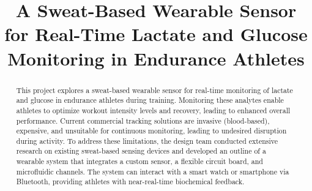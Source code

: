 \documentclass[conference]{IEEEtran}
\begin{document}
\title{A Sweat-Based Wearable Sensor for Real-Time Lactate and Glucose Monitoring in Endurance Athletes}

\medskip

\author{
\and
{}
\and
{}
}

\maketitle

\begin{abstract}
This project explores a sweat-based wearable sensor for real-time monitoring of lactate and glucose in endurance athletes during training. Monitoring these analytes enable athletes  to optimize workout intensity levels and recovery, leading to enhanced overall performance. Current commercial tracking solutions are invasive (blood-based), expensive, and unsuitable for continuous monitoring, leading to undesired disruption during activity. To address these limitations, the design team conducted extensive research on existing sweat-based sensing devices and developed an outline of a wearable system that integrates a custom sensor, a flexible circuit board, and microfluidic channels. The system can interact with a smart watch or smartphone via Bluetooth, providing athletes with near-real-time biochemical feedback.

\end{abstract}

\smallskip
\end{document}
